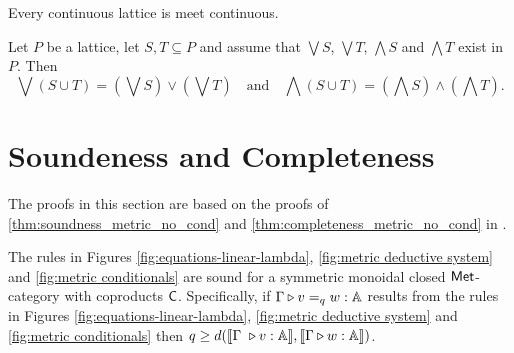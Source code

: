\begin{lemma} \cite[Proposition I-1.8]{gierzContinuousLatticesDomains2003} \label{lem:meet_continuos}
  Every continuous lattice is meet continuous.
\end{lemma}

\begin{lemma} \cite[Lemma 2.23]{daveyIntroductionLatticesOrder2002} \label{lem:sup_union}
Let \( P \) be a lattice, let \( S, T \subseteq P \) and assume that \( \bigvee S \),
\( \bigvee T \), \( \bigwedge S \) and \( \bigwedge T \) exist in \( P \). Then
$$ \bigvee(S \cup T) = \left(\bigvee S\right) \vee \left(\bigvee T\right) \quad \text{and} \quad \bigwedge(S \cup T) = \left(\bigwedge S\right) \wedge \left(\bigwedge T\right) . $$
\end{lemma}


\section{Soundeness and Completeness}
The proofs in this section are based on the proofs of 
\autoref{thm:soundness_metric_no_cond} and \autoref{thm:completeness_metric_no_cond} in \cite{dahlqvist2022syntactic}.

\begin{theorem}
  The rules in Figures \ref{fig:equations-linear-lambda}, \ref{fig:metric deductive system} and \ref{fig:metric conditionals} are sound for a  symmetric monoidal closed $\mathsf{Met}$-category with coproducts $\mathsf{C}$. Specifically, if $\Gamma \triangleright v =_{q} w : \mathbb{A} $ results from the rules in Figures  \ref{fig:equations-linear-lambda}, \ref{fig:metric deductive system} and \ref{fig:metric conditionals} then $q \geq d( \llbracket \Gamma  \vljud v : \typeA \rrbracket, \llbracket\Gamma \vljud w : \typeA \rrbracket)$.
\end{theorem}

